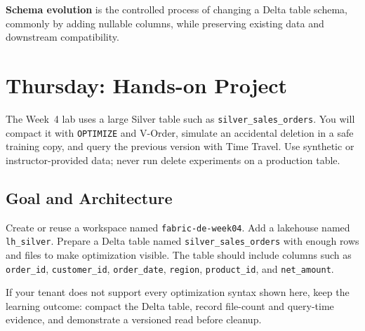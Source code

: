 \begin{definitionbox}
\textbf{Schema evolution} is the controlled process of changing a Delta table schema, commonly by adding nullable columns, while preserving existing data and downstream compatibility.
\end{definitionbox}

\section{Thursday: Hands-on Project}
The Week~4 lab uses a large Silver table such as \texttt{silver\_sales\_orders}. You will compact it with \texttt{OPTIMIZE} and V-Order, simulate an accidental deletion in a safe training copy, and query the previous version with Time Travel. Use synthetic or instructor-provided data; never run delete experiments on a production table.

\subsection{Goal and Architecture}
Create or reuse a workspace named \texttt{fabric-de-week04}. Add a lakehouse named \texttt{lh\_silver}. Prepare a Delta table named \texttt{silver\_sales\_orders} with enough rows and files to make optimization visible. The table should include columns such as \texttt{order\_id}, \texttt{customer\_id}, \texttt{order\_date}, \texttt{region}, \texttt{product\_id}, and \texttt{net\_amount}.

\begin{notebox}
If your tenant does not support every optimization syntax shown here, keep the learning outcome: compact the Delta table, record file-count and query-time evidence, and demonstrate a versioned read before cleanup.
\end{notebox}

